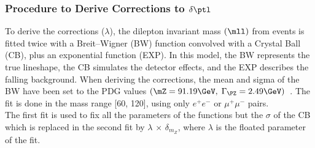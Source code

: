 \subsubsection{Procedure to Derive Corrections to $\delta \ptl$}
To derive the corrections ($\lambda$), the dilepton invariant mass $\left( \mll \right)$ from \ztolplm events is fitted twice with a Breit--Wigner (BW) function convolved with a Crystal Ball (CB), plus an exponential function (EXP).
In this model, the BW represents the true \mZ lineshape, the CB simulates the detector effects, and the EXP describes the falling background.
When deriving the corrections, the mean and sigma of the BW have been set to the PDG values $\left( \mZ = 91.19\GeV, \; \Gamma_{\PZ} = 2.49\GeV \right)$~\cite{particle_data_group_review_2020}.
 The fit is done in the mass range [60, 120]\GeV, using only
$e^{+}e^{-}$ or $\mu^{+}\mu^{-}$ pairs.\\
The first fit is used to fix all the parameters of the functions but the $\sigma$ of the CB which is
replaced in the second fit by $\lambda$ $\times$ $\delta_{m_{Z}}$, where $\lambda$ is the 
floated parameter of the fit. 


